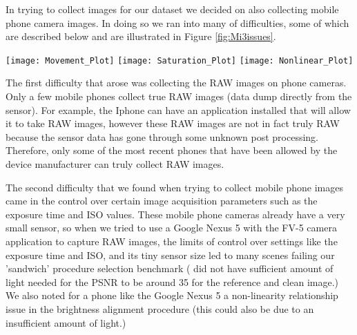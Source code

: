 \documentclass[review]{elsarticle}
\begin{document}
In trying to collect images for our dataset we decided on also collecting mobile phone camera images. In doing so we ran into many of difficulties, some of which are described below and are illustrated in Figure \ref{fig:Mi3issues}. 
\begin{figure*}[htb]
\vspace{-3mm}
\centering
\hspace{-2mm}
\texttt{[image: Movement\_Plot]}
\hspace{-2mm}
\texttt{[image: Saturation\_Plot]}
\hspace{-2mm}
\texttt{[image: Nonlinear\_Plot]}
\vskip-5mm
\caption{Intensity alignment issues observed on scatter plots of the intensity difference between the reference image and aligned noisy image vs reference image intensity. Left: image movement during the 'sandwich' procedure. Middle: light saturation. Right: non-linearity at high ISO levels.}\label {fig:Mi3issues}
\vspace{-4mm}
\end{figure*}


The first difficulty that arose was collecting the RAW images on phone cameras. Only a few mobile phones collect true RAW images (data dump directly from the sensor). For example, the Iphone can have an application installed that will allow it to take RAW images, however these RAW images are not in fact truly RAW because the sensor data has gone through some unknown post processing. Therefore, only some of the most recent phones that have been allowed by the device manufacturer can truly collect RAW images.

The second difficulty that we found when trying to collect mobile phone images came in the control over certain image acquisition parameters such as the exposure time and ISO values. These mobile phone cameras already have a very small sensor, so when we tried to use a Google Nexus 5 with the  FV-5 camera application to capture RAW images, the limits of control over settings like the exposure time and ISO, and its tiny sensor size led to many scenes failing our 'sandwich' procedure selection benchmark ( did not have sufficient amount of light needed for the PSNR to be around 35 for the reference and clean image.) We also noted for a phone like the Google Nexus 5 a non-linearity relationship issue in the brightness alignment procedure (this could also be due to an insufficient amount of light.) 
\end{document}
